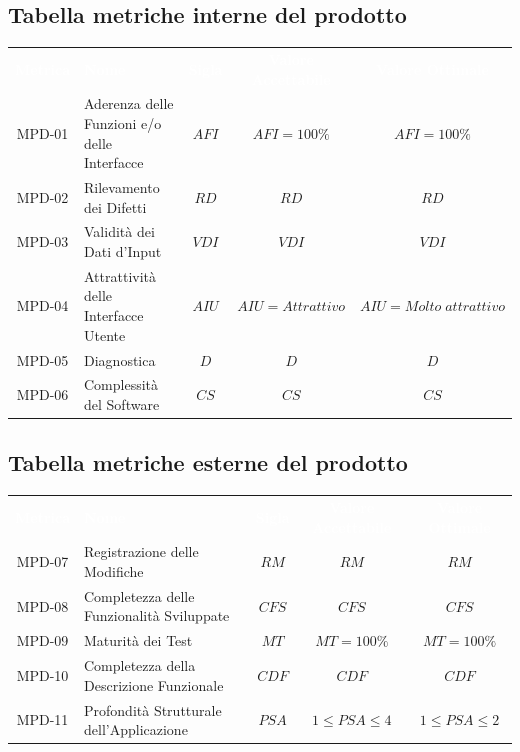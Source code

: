 \subsection{Tabella metriche interne del prodotto}
    \renewcommand{\arraystretch}{1.5}
    \begin{longtable}{ c C{4cm} c c c}
    \textcolor{white}{\textbf{Metrica}} & \textcolor{white}{\textbf{Nome}} & \textcolor{white}{\textbf{Sigla}} & \textcolor{white}{\textbf{Valore Accettabile}} & \textcolor{white}{\textbf{Valore Ottimale}}\\
    MPD-01 & Aderenza delle Funzioni e/o delle Interfacce & $AFI$ & $AFI=100\%$ & $AFI=100\%$ \\
    MPD-02 & Rilevamento dei Difetti & $RD$ & $ RD $ & $RD$ \\
    MPD-03 & Validità dei Dati d'Input & $VDI$ &  $VDI $ &  $VDI$ \\
    MPD-04 & Attrattività delle Interfacce Utente & $AIU$ & $AIU = Attrattivo$ &  $AIU = Molto \; attrattivo$ \\
    MPD-05 & Diagnostica & $D$ & $D $ & $D $ \\
    MPD-06 & Complessità del Software & $CS$ & $CS$ & $CS$ \\
    \end{longtable} 

\newpage %

\subsection{Tabella metriche esterne del prodotto}
    \renewcommand{\arraystretch}{1.5}
    \begin{longtable}{ c C{4cm} c c c}
    \textcolor{white}{\textbf{Metrica}} & \textcolor{white}{\textbf{Nome}} & \textcolor{white}{\textbf{Sigla}} & \textcolor{white}{\textbf{Valore Accettabile}} & \textcolor{white}{\textbf{Valore Ottimale}}\\
    MPD-07 & Registrazione delle Modifiche & $RM$ & $RM$ & $RM$ \\
    MPD-08 & Completezza delle Funzionalità Sviluppate & $CFS$ & $CFS$ & $CFS$  \\
    MPD-09 & Maturità dei Test & $MT$ & $MT=100\% $ & $MT=100\%$  \\	
    MPD-10 & Completezza della Descrizione Funzionale & $CDF$ & $CDF$ & $CDF$  \\
    MPD-11 &  Profondità Strutturale dell'Applicazione & $PSA$ & $1 \leq PSA \leq 4$ &$1 \leq PSA \leq 2$  \\
    \end{longtable}  
                
       
                 
       
       
